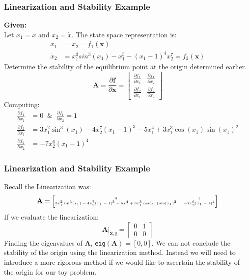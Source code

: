 \documentclass[11pt,handout]{beamer}   %
\begin{document}
\begin{frame}
\frametitle{Linearization and Stability Example}
\small
\textbf{Given:}\\
Let $x_1 = x$ and $x_2 = \dot{x}$. The state space representation is:
\begin{equation*}
\begin{aligned}
\dot{x}_1 &= x_2 = f_1(\mathbf{x})\\
\dot{x}_2 &= x_1^3sin^3(x_1) - x_1^5 - (x_1-1)^4x_2^7 = f_2(\mathbf{x})
\end{aligned}
\end{equation*}
Determine the stability of the equilibrium point at the origin determined earlier.
\begin{equation*}
\mathbf{A} = \frac{\partial \mathbf{f}}{\partial \mathbf{x}} = \begin{bmatrix}
\frac{\partial f_1}{\partial x_1} & \frac{\partial f_1}{\partial x_2} \\
\frac{\partial f_2}{\partial x_1} & \frac{\partial f_2}{\partial x_2}
\end{bmatrix}
\end{equation*}
Computing:
\begin{equation*}
\begin{aligned}
\frac{\partial f_1}{\partial x_1} &= 0 \;\; \& \;\; \frac{\partial f_1}{\partial x_2} = 1\\
\frac{\partial f_2}{\partial x_1} &= 3 x_1^2 \sin^3(x_1) - 4 x_2^7 (x_1 - 1)^3 - 5 x_1^4 + 3 x_1^3 \cos(x_1) \sin(x_1)^2
\\
\frac{\partial f_2}{\partial x_2} &= -7 x_2^6 (x_1 - 1)^4
\end{aligned}
\end{equation*}
\end{frame}

\begin{frame}
\frametitle{Linearization and Stability Example}
\small
Recall the Linearization was:
\begin{equation*}
\tiny
\mathbf{A} = \begin{bmatrix}
0 & 1\\
3 x_1^2 \sin^3(x_1) - 4 x_2^7 (x_1 - 1)^3 - 5 x_1^4 + 3 x_1^3 \cos(x_1) \sin(x_1)^2 & -7 x_2^6 (x_1 - 1)^4
\end{bmatrix}
\end{equation*}
If we evaluate the linearization:
\begin{equation*}
\left. \mathbf{A}\right.|_{\mathbf{x}_eq} = \begin{bmatrix}
0 & 1\\ 0&0
\end{bmatrix}
\end{equation*}
Finding the eigenvalues of $\mathbf{A}$, \texttt{eig}$(\mathbf{A}) = [0,0]$.
We can not conclude the stability of the origin using the linearization method. Instead we will need to introduce a more rigorous method if we would like to ascertain the stability of the origin for our toy problem.
\end{frame}
\end{document}
